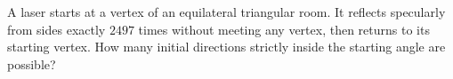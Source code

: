 A laser starts at a vertex of an equilateral triangular room. It reflects specularly from sides exactly $2497$ times without meeting any vertex, then returns to its starting vertex. How many initial directions strictly inside the starting angle are possible?
